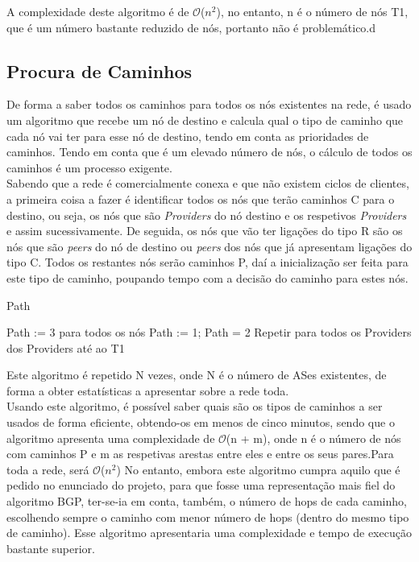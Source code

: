 \documentclass[twocolumn]{article} %
\begin{document}
			\noindent A complexidade deste algoritmo é de $\mathcal{O}$($n^{2}$), no entanto, n é o número de nós T1, que é um número bastante reduzido de nós, portanto não é problemático.d

		\subsection{Procura de Caminhos}
			De forma a saber todos os caminhos para todos os nós existentes na rede, é usado um algoritmo que recebe um nó de destino e calcula qual o tipo de caminho que cada nó vai ter para esse nó de destino, tendo em conta as prioridades de caminhos. Tendo em conta que é um elevado número de nós, o cálculo de todos os caminhos é um processo exigente.\\
			
			\noindent Sabendo que a rede é comercialmente conexa e que não existem ciclos de clientes, a primeira coisa a fazer é identificar todos os nós que terão caminhos C para o destino, ou seja, os nós que são \emph{Providers} do nó destino e os respetivos \emph{Providers} e assim sucessivamente. De seguida, os nós que vão ter ligações do tipo R são os nós que são \emph{peers} do nó de destino ou \emph{peers} dos nós que já apresentam ligações do tipo C. Todos os restantes nós serão caminhos P, daí a inicialização ser feita para este tipo de caminho, poupando tempo com a decisão do caminho para estes nós.\\

			\begin{algorithm}[htbp]
			\caption{Path}
			\begin{algorithmic}[1]
				
				\State Path := 3 para todos os nós
					\State Path := 1;
							\State Path = 2
						\EndIf
					\EndFor
					\State Repetir para todos os Providers dos Providers até ao T1
				\EndFor

			\end{algorithmic}
			\end{algorithm}

			\noindent Este algoritmo é repetido N vezes, onde N é o número de ASes existentes, de forma a obter estatísticas a apresentar sobre a rede toda.\\

			\noindent Usando este algoritmo, é possível saber quais são os tipos de caminhos a ser usados de forma eficiente, obtendo-os em menos de cinco minutos, sendo que o algoritmo apresenta uma complexidade de $\mathcal{O}$(n + m), onde n é o número de nós com caminhos P e m as respetivas arestas entre eles e entre os seus pares.Para toda a rede, será $\mathcal{O}$($n^{2}$) No entanto, embora este algoritmo cumpra aquilo que é pedido no enunciado do projeto, para que fosse uma representação mais fiel do algoritmo BGP, ter-se-ia em conta, também, o número de hops de cada caminho, escolhendo sempre o caminho com menor número de hops (dentro do mesmo tipo de caminho). Esse algoritmo apresentaria uma complexidade e tempo de execução bastante superior.\\
\end{document}
